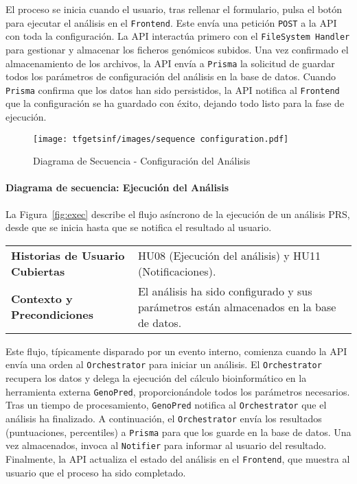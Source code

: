 El proceso se inicia cuando el usuario, tras rellenar el formulario, pulsa el botón para ejecutar el análisis en el \texttt{Frontend}. Este envía una petición \texttt{POST} a la API con toda la configuración. La API interactúa primero con el \texttt{FileSystem Handler} para gestionar y almacenar los ficheros genómicos subidos. Una vez confirmado el almacenamiento de los archivos, la API envía a \texttt{Prisma} la solicitud de guardar todos los parámetros de configuración del análisis en la base de datos. Cuando \texttt{Prisma} confirma que los datos han sido persistidos, la API notifica al \texttt{Frontend} que la configuración se ha guardado con éxito, dejando todo listo para la fase de ejecución.

\begin{figure}[H]
    \centering
    \texttt{[image: tfgetsinf/images/sequence configuration.pdf]}
    \caption{Diagrama de Secuencia - Configuración del Análisis}
    \label{fig:config}
\end{figure}

\paragraph{Diagrama de secuencia: Ejecución del Análisis}
La Figura~\ref{fig:exec} describe el flujo asíncrono de la ejecución de un análisis PRS, desde que se inicia hasta que se notifica el resultado al usuario.

\begin{table}[H]
    \centering
    \small
    \begin{tabular}{|p{6cm}|p{8cm}|}
        \hline
        \textbf{Historias de Usuario Cubiertas} & HU08 (Ejecución del análisis) y HU11 (Notificaciones). \\
        \textbf{Contexto y Precondiciones} & El análisis ha sido configurado y sus parámetros están almacenados en la base de datos. \\
        \hline
    \end{tabular}
\end{table}

Este flujo, típicamente disparado por un evento interno, comienza cuando la API envía una orden al \texttt{Orchestrator} para iniciar un análisis. El \texttt{Orchestrator} recupera los datos y delega la ejecución del cálculo bioinformático en la herramienta externa \texttt{GenoPred}, proporcionándole todos los parámetros necesarios. Tras un tiempo de procesamiento, \texttt{GenoPred} notifica al \texttt{Orchestrator} que el análisis ha finalizado. A continuación, el \texttt{Orchestrator} envía los resultados (puntuaciones, percentiles) a \texttt{Prisma} para que los guarde en la base de datos. Una vez almacenados, invoca al \texttt{Notifier} para informar al usuario del resultado. Finalmente, la API actualiza el estado del análisis en el \texttt{Frontend}, que muestra al usuario que el proceso ha sido completado.

